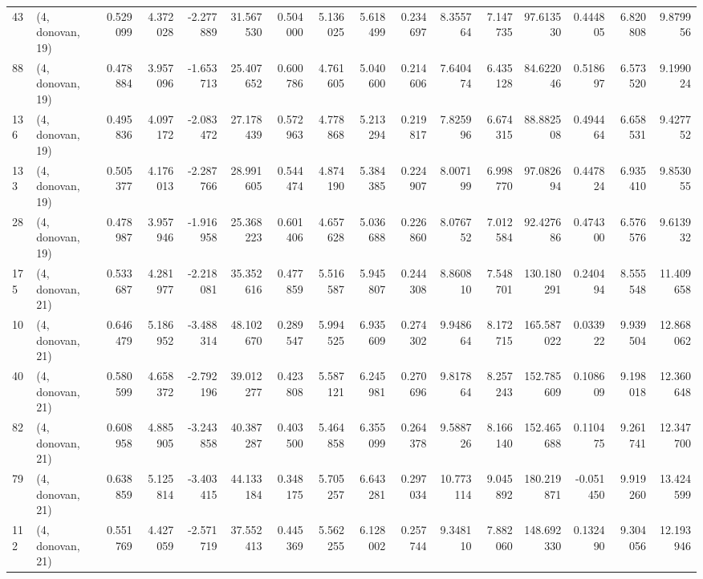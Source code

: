 \begin{tabular}{llrrrrrrrrrrrrrr}
43  &  (4, donovan, 19) &   0.529099 &   4.372028 & -2.277889 &   31.567530 &  0.504000 &   5.136025 &   5.618499 &  0.234697 &   8.355764 &   7.147735 &   97.613530 &  0.444805 &   6.820808 &   9.879956 \\
88  &  (4, donovan, 19) &   0.478884 &   3.957096 & -1.653713 &   25.407652 &  0.600786 &   4.761605 &   5.040600 &  0.214606 &   7.640474 &   6.435128 &   84.622046 &  0.518697 &   6.573520 &   9.199024 \\
136 &  (4, donovan, 19) &   0.495836 &   4.097172 & -2.083472 &   27.178439 &  0.572963 &   4.778868 &   5.213294 &  0.219817 &   7.825996 &   6.674315 &   88.882508 &  0.494464 &   6.658531 &   9.427752 \\
133 &  (4, donovan, 19) &   0.505377 &   4.176013 & -2.287766 &   28.991605 &  0.544474 &   4.874190 &   5.384385 &  0.224907 &   8.007199 &   6.998770 &   97.082694 &  0.447824 &   6.935410 &   9.853055 \\
28  &  (4, donovan, 19) &   0.478987 &   3.957946 & -1.916958 &   25.368223 &  0.601406 &   4.657628 &   5.036688 &  0.226860 &   8.076752 &   7.012584 &   92.427686 &  0.474300 &   6.576576 &   9.613932 \\
175 &  (4, donovan, 21) &   0.533687 &   4.281977 & -2.218081 &   35.352616 &  0.477859 &   5.516587 &   5.945807 &  0.244308 &   8.860810 &   7.548701 &  130.180291 &  0.240494 &   8.555548 &  11.409658 \\
10  &  (4, donovan, 21) &   0.646479 &   5.186952 & -3.488314 &   48.102670 &  0.289547 &   5.994525 &   6.935609 &  0.274302 &   9.948664 &   8.172715 &  165.587022 &  0.033922 &   9.939504 &  12.868062 \\
40  &  (4, donovan, 21) &   0.580599 &   4.658372 & -2.792196 &   39.012277 &  0.423808 &   5.587121 &   6.245981 &  0.270696 &   9.817864 &   8.257243 &  152.785609 &  0.108609 &   9.198018 &  12.360648 \\
82  &  (4, donovan, 21) &   0.608958 &   4.885905 & -3.243858 &   40.387287 &  0.403500 &   5.464858 &   6.355099 &  0.264378 &   9.588726 &   8.166140 &  152.465688 &  0.110475 &   9.261741 &  12.347700 \\
79  &  (4, donovan, 21) &   0.638859 &   5.125814 & -3.403415 &   44.133184 &  0.348175 &   5.705257 &   6.643281 &  0.297034 &  10.773114 &   9.045892 &  180.219871 & -0.051450 &   9.919260 &  13.424599 \\
112 &  (4, donovan, 21) &   0.551769 &   4.427059 & -2.571719 &   37.552413 &  0.445369 &   5.562255 &   6.128002 &  0.257744 &   9.348110 &   7.882060 &  148.692330 &  0.132490 &   9.304056 &  12.193946 \\

\end{tabular}
